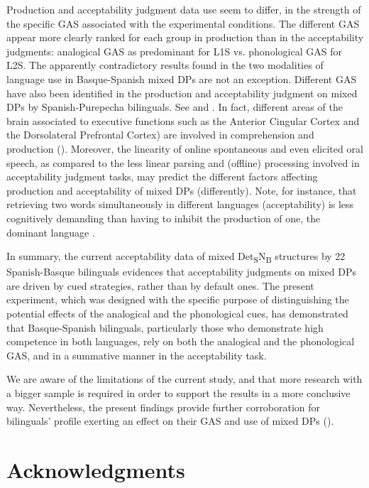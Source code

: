 \documentclass[output=paper]{langscibook}
\begin{document}
Production and acceptability judgment data use seem to differ, in the strength of the specific GAS associated with the experimental conditions. The different GAS appear more clearly ranked for each group in production than in the acceptability judgments: analogical GAS as predominant for L1S vs. phonological GAS for L2S. The apparently contradictory results found in the two modalities of language use in Basque-Spanish mixed DPs are not an exception. Different GAS have also been identified in the production and acceptability judgment on mixed DPs by Spanish-Purepecha bilinguals. See \citet{BellamyEtAl2018} and    \citet{BellamyParafitaCouto2022}. In fact, different areas of the brain associated to executive functions such as the Anterior Cingular Cortex and the Dorsolateral Prefrontal Cortex) are involved in comprehension and production (\citealt{Blanco-ElorrietaPylkkänen2018}). Moreover, the linearity of online spontaneous and even elicited oral speech, as compared to the less linear parsing and (offline) processing involved in acceptability judgment tasks, may predict the different factors affecting production and acceptability of mixed DPs (differently). Note, for instance, that retrieving two words simultaneously in different languages (acceptability) is less cognitively demanding than having to inhibit the production of one, the dominant language \citep{Blanco-ElorrietaEtAl2018}.

In summary, the current acceptability data of mixed Det\textsubscript{S}N\textsubscript{B} structures by 22 Spanish-Basque bilinguals evidences that acceptability judgments on mixed DPs are driven by cued strategies, rather than by default ones. The present experiment, which was designed with the specific purpose of distinguishing the potential effects of the analogical and the phonological cues, has demonstrated that Basque-Spanish bilinguals, particularly those who demonstrate high competence in both languages, rely on both the analogical and the phonological GAS, and in a summative manner in the acceptability task.

We are aware of the limitations of the current study, and that more research with a bigger sample is required in order to support the results in a more conclusive way. Nevertheless, the present findings provide further corroboration for bilinguals' profile exerting an effect on their GAS and use of mixed DPs (\citealt{BellamyParafitaCouto2022,LicerasFernándezFuertessubmitted,ValdésKroffEtAl2017}).

\section*{Acknowledgments}
\end{document}
